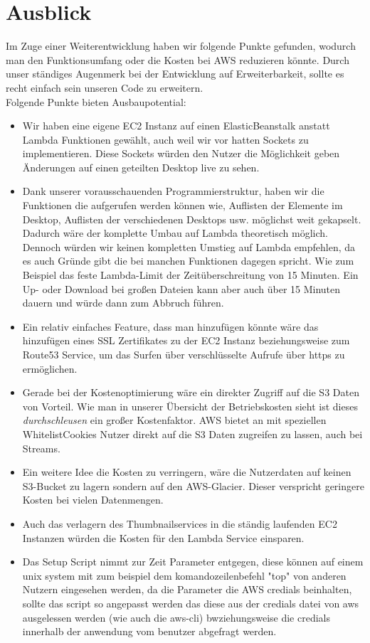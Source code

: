 \documentclass[a4paper, 12pt]{scrreprt}
\renewcommand\_{\textunderscore\allowbreak}
\begin{document}
\chapter{Ausblick}
Im Zuge einer Weiterentwicklung haben wir folgende Punkte gefunden, wodurch man den Funktionsumfang oder die Kosten bei AWS reduzieren könnte. Durch unser ständiges Augenmerk bei der Entwicklung auf Erweiterbarkeit, sollte es recht einfach sein unseren Code zu erweitern. \\
Folgende Punkte bieten Ausbaupotential:
\begin{itemize}
\item Wir haben eine eigene EC2 Instanz auf einen ElasticBeanstalk anstatt Lambda Funktionen gewählt, auch weil wir vor hatten Sockets zu implementieren. Diese Sockets würden den Nutzer die Möglichkeit geben Änderungen auf einen geteilten Desktop live zu sehen. 
\item Dank unserer vorausschauenden Programmierstruktur, haben wir die Funktionen die aufgerufen werden können wie, Auflisten der Elemente im Desktop, Auflisten der verschiedenen Desktops usw. möglichst weit gekapselt. Dadurch wäre der komplette Umbau auf Lambda theoretisch möglich. Dennoch würden wir keinen kompletten Umstieg auf Lambda empfehlen, da es auch Gründe gibt die bei manchen Funktionen dagegen spricht. Wie zum Beispiel das feste Lambda-Limit der Zeitüberschreitung von 15 Minuten. Ein Up- oder Download bei großen Dateien kann aber auch über 15 Minuten dauern und würde dann zum Abbruch führen.
\item Ein relativ einfaches Feature, dass man hinzufügen könnte wäre das hinzufügen eines SSL Zertifikates zu der EC2 Instanz beziehungsweise zum Route53 Service, um das Surfen über verschlüsselte Aufrufe über https zu ermöglichen. 
\item Gerade bei der Kostenoptimierung wäre ein direkter Zugriff auf die S3 Daten von Vorteil. Wie man in unserer Übersicht der Betriebskosten sieht ist dieses \emph{durchschleusen} ein großer Kostenfaktor. AWS bietet an mit speziellen \glqq Whitelist\grqq  Cookies Nutzer direkt auf die S3 Daten zugreifen zu lassen, auch bei Streams.
\item Ein weitere Idee die Kosten zu verringern, wäre die Nutzerdaten auf keinen S3-Bucket zu lagern sondern auf den AWS-Glacier. Dieser verspricht geringere Kosten bei vielen Datenmengen.
\item Auch das verlagern des Thumbnailservices in die ständig laufenden EC2 Instanzen würden die Kosten für den Lambda Service einsparen.
\item Das Setup Script nimmt zur Zeit Parameter entgegen, diese können auf einem unix system mit zum beispiel dem komandozeilenbefehl "top" von anderen Nutzern eingesehen werden, da die Parameter die AWS credials beinhalten, sollte das script so angepasst werden das diese aus der credials datei von aws ausgelessen werden (wie auch die aws-cli) bwziehungsweise die credials innerhalb der anwendung vom benutzer abgefragt werden.
\end{itemize}


\clearpage


%
\end{document}
